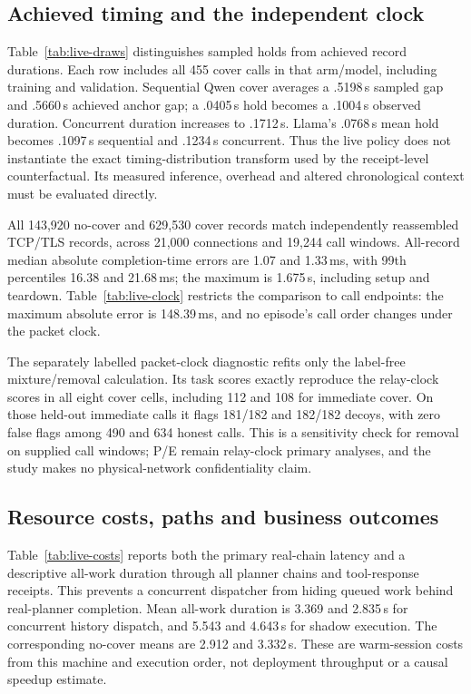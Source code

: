 \subsection{Achieved timing and the independent clock}
Table~\ref{tab:live-draws} distinguishes sampled holds from achieved record durations. Each row includes all 455 cover calls in that arm/model, including training and validation. Sequential Qwen cover averages a .5198\,s sampled gap and .5660\,s achieved anchor gap; a .0405\,s hold becomes a .1004\,s observed duration. Concurrent duration increases to .1712\,s. Llama's .0768\,s mean hold becomes .1097\,s sequential and .1234\,s concurrent. Thus the live policy does not instantiate the exact timing-distribution transform used by the receipt-level counterfactual. Its measured inference, overhead and altered chronological context must be evaluated directly.

All 143,920 no-cover and 629,530 cover records match independently reassembled TCP/TLS records, across 21,000 connections and 19,244 call windows. All-record median absolute completion-time errors are 1.07 and 1.33\,ms, with 99th percentiles 16.38 and 21.68\,ms; the maximum is 1.675\,s, including setup and teardown. Table~\ref{tab:live-clock} restricts the comparison to call endpoints: the maximum absolute error is 148.39\,ms, and no episode's call order changes under the packet clock.

The separately labelled packet-clock diagnostic refits only the label-free mixture/removal calculation. Its task scores exactly reproduce the relay-clock scores in all eight cover cells, including 112 and 108 for immediate cover. On those held-out immediate calls it flags 181/182 and 182/182 decoys, with zero false flags among 490 and 634 honest calls. This is a sensitivity check for removal on supplied call windows; P/E remain relay-clock primary analyses, and the study makes no physical-network confidentiality claim.




\subsection{Resource costs, paths and business outcomes}
Table~\ref{tab:live-costs} reports both the primary real-chain latency and a descriptive all-work duration through all planner chains and tool-response receipts. This prevents a concurrent dispatcher from hiding queued work behind real-planner completion. Mean all-work duration is 3.369 and 2.835\,s for concurrent history dispatch, and 5.543 and 4.643\,s for shadow execution. The corresponding no-cover means are 2.912 and 3.332\,s. These are warm-session costs from this machine and execution order, not deployment throughput or a causal speedup estimate.

